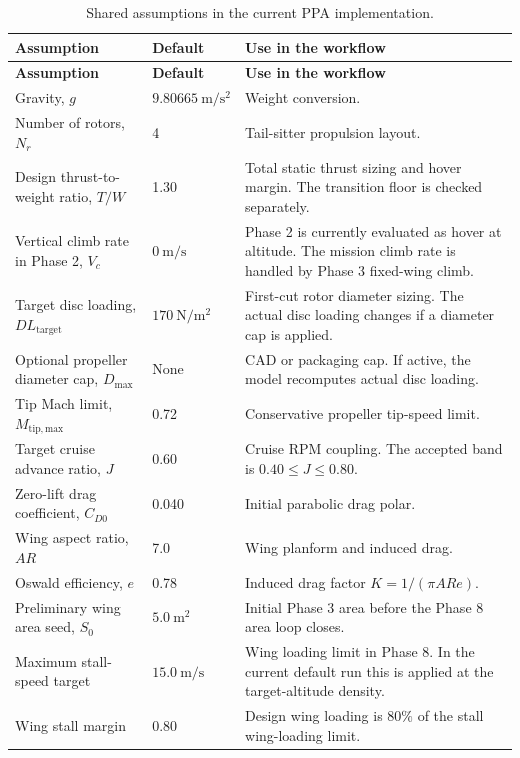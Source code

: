 \begin{longtable}{@{}p{}p{}p{}@{}}
\caption{Shared assumptions in the current PPA implementation.}
\label{tab:ppa_assumptions}\\
\toprule
\textbf{Assumption} & \textbf{Default} & \textbf{Use in the workflow} \\
\midrule
\endfirsthead
\toprule
\textbf{Assumption} & \textbf{Default} & \textbf{Use in the workflow} \\
\midrule
\endhead
\bottomrule
\endfoot
Gravity, \(g\) & \(9.80665~\mathrm{m/s^2}\) & Weight conversion. \\
Number of rotors, \(N_r\) & 4 & Tail-sitter propulsion layout. \\
Design thrust-to-weight ratio, \(T/W\) & 1.30 & Total static thrust sizing and hover margin. The transition floor is checked separately. \\
Vertical climb rate in Phase 2, \(V_c\) & \(0~\mathrm{m/s}\) & Phase 2 is currently evaluated as hover at altitude. The mission climb rate is handled by Phase 3 fixed-wing climb. \\
Target disc loading, \(DL_{\mathrm{target}}\) & \(170~\mathrm{N/m^2}\) & First-cut rotor diameter sizing. The actual disc loading changes if a diameter cap is applied. \\
Optional propeller diameter cap, \(D_{\max}\) & None & CAD or packaging cap. If active, the model recomputes actual disc loading. \\
Tip Mach limit, \(M_{\mathrm{tip,max}}\) & 0.72 & Conservative propeller tip-speed limit. \\
Target cruise advance ratio, \(J\) & 0.60 & Cruise RPM coupling. The accepted band is \(0.40 \leq J \leq 0.80\). \\
Zero-lift drag coefficient, \(C_{D0}\) & 0.040 & Initial parabolic drag polar. \\
Wing aspect ratio, \(AR\) & 7.0 & Wing planform and induced drag. \\
Oswald efficiency, \(e\) & 0.78 & Induced drag factor \(K=1/(\pi AR e)\). \\
Preliminary wing area seed, \(S_0\) & \(5.0~\mathrm{m^2}\) & Initial Phase 3 area before the Phase 8 area loop closes. \\
Maximum stall-speed target & \(15.0~\mathrm{m/s}\) & Wing loading limit in Phase 8. In the current default run this is applied at the target-altitude density. \\
Wing stall margin & 0.80 & Design wing loading is \(80\%\) of the stall wing-loading limit. \\

\end{longtable}
